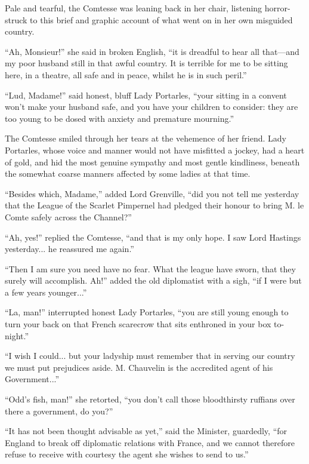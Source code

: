 \documentclass[paper=5.5in:8.5in,BCOR=7mm,twoside,DIV=calc,12pt,usegeometry,chapterprefix,endperiod,headings=big]{scrbook}
\begin{document}
Pale and tearful, the Comtesse was leaning back in her chair, listening horror-struck to this brief and graphic account of what went on in her own misguided country.

\enquote{Ah, Monsieur!} she said in broken English, \enquote{it is dreadful to hear all that---and my poor husband still in that awful country. It is terrible for me to be sitting here, in a theatre, all safe and in peace, whilst he is in such peril.}

\enquote{Lud, Madame!} said honest, bluff Lady Portarles, \enquote{your sitting in a convent won't make your husband safe, and you have your children to consider: they are too young to be dosed with anxiety and premature mourning.}

The Comtesse smiled through her tears at the vehemence of her friend. Lady Portarles, whose voice and manner would not have misfitted a jockey, had a heart of gold, and hid the most genuine sympathy and most gentle kindliness, beneath the somewhat coarse manners affected by some ladies at that time.

\enquote{Besides which, Madame,} added Lord Grenville, \enquote{did you not tell me yesterday that the League of the Scarlet Pimpernel had pledged their honour to bring M. le Comte safely across the Channel?}

\enquote{Ah, yes!} replied the Comtesse, \enquote{and that is my only hope. I saw Lord Hastings yesterday... he reassured me again.}

\enquote{Then I am sure you need have no fear. What the league have sworn, that they surely will accomplish. Ah!} added the old diplomatist with a sigh, \enquote{if I were but a few years younger...}

\enquote{La, man!} interrupted honest Lady Portarles, \enquote{you are still young enough to turn your back on that French scarecrow that sits enthroned in your box to-night.}

\enquote{I wish I could... but your ladyship must remember that in serving our country we must put prejudices aside. M. Chauvelin is the accredited agent of his Government...}

\enquote{Odd's fish, man!} she retorted, \enquote{you don't call those bloodthirsty ruffians over there a government, do you?}

\enquote{It has not been thought advisable as yet,} said the Minister, guardedly, \enquote{for England to break off diplomatic relations with France, and we cannot therefore refuse to receive with courtesy the agent she wishes to send to us.}
\end{document}
